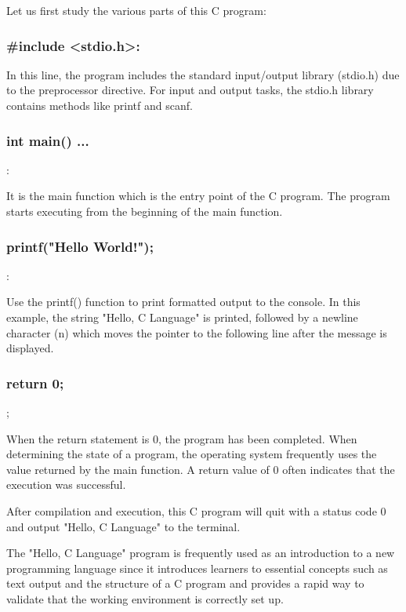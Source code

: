 


Let us first study the various parts of this C program:

\subsubsection{\#include <stdio.h>:}

In this line, the program includes the standard input/output library (stdio.h) due to the preprocessor directive. For input and output tasks, the stdio.h library contains methods like printf and scanf.

\subsubsection{int main() { ... }}:

It is the main function which is the entry point of the C program. The program starts executing from the beginning of the main function.

\subsubsection{printf("Hello World!");}:

Use the printf() function to print formatted output to the console. In this example, the string "Hello, C Language" is printed, followed by a newline character (n) which moves the pointer to the following line after the message is displayed.

\subsubsection{return 0;};

When the return statement is 0, the program has been completed. When determining the state of a program, the operating system frequently uses the value returned by the main function. A return value of 0 often indicates that the execution was successful.

After compilation and execution, this C program will quit with a status code 0 and output "Hello, C Language" to the terminal.

The "Hello, C Language" program is frequently used as an introduction to a new programming language since it introduces learners to essential concepts such as text output and the structure of a C program and provides a rapid way to validate that the working environment is correctly set up.


